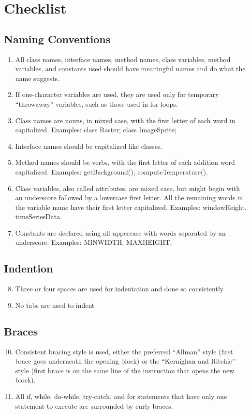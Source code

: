 \section{Checklist}
	\subsection{Naming Conventions}
	\begin{enumerate}
		\item All class names, interface names, method names, class variables, method variables, and constants used should have meaningful names and do what the name suggests.
		\item If one-character variables are used, they are used only for temporary “throwaway” variables, such as those used in for loops.
		\item Class names are nouns, in mixed case, with the first letter of each word in capitalized. Examples: class Raster; class ImageSprite;
		\item Interface names should be capitalized like classes.
		\item Method names should be verbs, with the first letter of each addition word capitalized. Examples: getBackground(); computeTemperature().
		\item Class variables, also called attributes, are mixed case, but might begin with an underscore followed by a lowercase first letter. All the remaining words in the variable name have their first letter capitalized. Examples: \textunderscore windowHeight, timeSeriesData.
		\item Constants are declared using all uppercase with words separated by an underscore. Examples: MIN\textunderscore WIDTH; MAX\textunderscore HEIGHT;
	\end{enumerate}
	\subsection{Indention}
	\begin{enumerate}
		\setcounter{enumi}{7}
		\item Three or four spaces are used for indentation and done so consistently
		\item No tabs are used to indent
	\end{enumerate}
	\subsection{Braces}
	\begin{enumerate}
		\setcounter{enumi}{9}
		\item Consistent bracing style is used, either the preferred “Allman” style (first brace goes underneath the opening block) or the “Kernighan and Ritchie” style (first brace is on the same line of the instruction that opens the new block).
		\item All if, while, do-while, try-catch, and for statements that have only one statement to execute are surrounded by curly braces.
	\end{enumerate}
